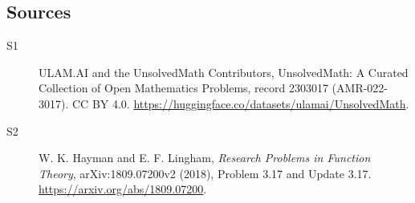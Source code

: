 \documentclass[11pt]{article}
\begin{document}
\subsection{Sources}
\begin{description}
\item[\hypertarget{source:2303017:1}{S1}] ULAM.AI and the UnsolvedMath Contributors, UnsolvedMath: A Curated Collection of Open Mathematics Problems, record 2303017 (AMR-022-3017). CC BY 4.0. \url{https://huggingface.co/datasets/ulamai/UnsolvedMath}.
\item[\hypertarget{source:2303017:2}{S2}] W. K. Hayman and E. F. Lingham, \emph{Research Problems in Function Theory}, arXiv:1809.07200v2 (2018), Problem 3.17 and Update 3.17. \url{https://arxiv.org/abs/1809.07200}.
\end{description}
\label{end:2303017}
\end{document}
